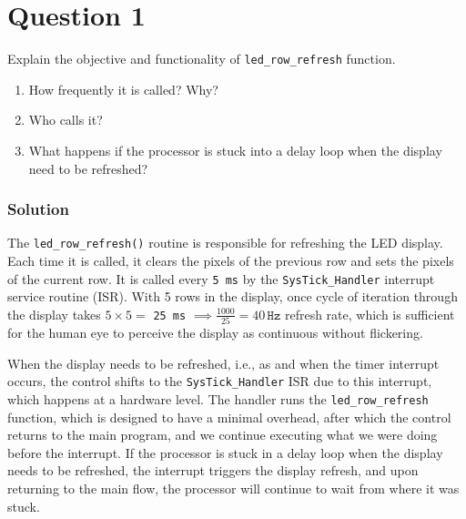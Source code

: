 \section*{Question 1}

Explain the objective and functionality of \texttt{led\_row\_refresh} function.

\begin{enumerate}[label= (\alph*), noitemsep, topsep=0pt]
    \item How frequently it is called? Why?
    \item Who calls it?
    \item What happens if the processor is stuck into a delay loop when the display need to be refreshed?
\end{enumerate}

\subsubsection*{Solution}

The \texttt{led\_row\_refresh\@()} routine is responsible for refreshing the LED display.
Each time it is called, it clears the pixels of the previous row and sets the pixels of the current row.
It is called every \texttt{5\,\texttt{ms}} by the \texttt{SysTick\_Handler} interrupt service routine (ISR).
With 5 rows in the display, once cycle of iteration through the display takes \( 5 \times 5 = \) \texttt{25\,\texttt{ms}} \( \implies \frac{1000}{25} = 40\,\texttt{Hz} \) refresh rate, which is sufficient for the human eye to perceive the display as continuous without flickering.

When the display needs to be refreshed, i.e., as and when the timer interrupt occurs, the control shifts to the \texttt{SysTick\_Handler} ISR due to this interrupt, which happens at a hardware level.
The handler runs the \texttt{led\_row\_refresh} function, which is designed to have a minimal overhead, after which the control returns to the main program, and we continue executing what we were doing before the interrupt.
If the processor is stuck in a delay loop when the display needs to be refreshed, the interrupt triggers the display refresh, and upon returning to the main flow, the processor will continue to wait from where it was stuck.
